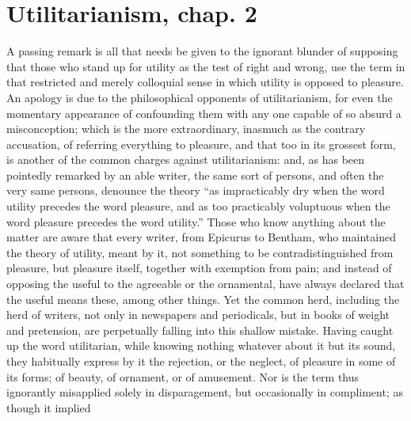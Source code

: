 
\author{John Stuart Mill}
\chapter[John Stuart Mill -- Utilitarianism, chap. 2]{Utilitarianism,
chap. 2}



A passing remark is all that needs be given to the ignorant
blunder of supposing that those who stand up for utility as the test
of right and wrong, use the term in that restricted and merely
colloquial sense in which utility is opposed to pleasure. An apology
is due to the philosophical opponents of utilitarianism, for even the
momentary appearance of confounding them with any one capable of so
absurd a misconception; which is the more extraordinary, inasmuch as
the contrary accusation, of referring everything to pleasure, and that
too in its grossest form, is another of the common charges against
utilitarianism: and, as has been pointedly remarked by an able
writer, the same sort of persons, and often the very same persons,
denounce the theory ``as impracticably dry when the word utility
precedes the word pleasure, and as too practicably voluptuous when the
word pleasure precedes the word utility.'' Those who know anything
about the matter are aware that every writer, from Epicurus to
Bentham, who maintained the theory of utility, meant by it, not
something to be contradistinguished from pleasure, but pleasure
itself, together with exemption from pain; and instead of opposing the
useful to the agreeable or the ornamental, have always declared that
the useful  means these, among other things. Yet the common
herd, including the herd of writers, not only in newspapers and
periodicals, but in books of weight and pretension, are perpetually
falling into this shallow mistake. Having caught up the word
utilitarian, while knowing nothing whatever about it but its sound,
they habitually express by it the rejection, or the neglect, of
pleasure in some of its forms; of beauty, of ornament, or of
amusement. Nor is the term thus ignorantly misapplied solely in
disparagement, but occasionally in compliment; as though it implied
